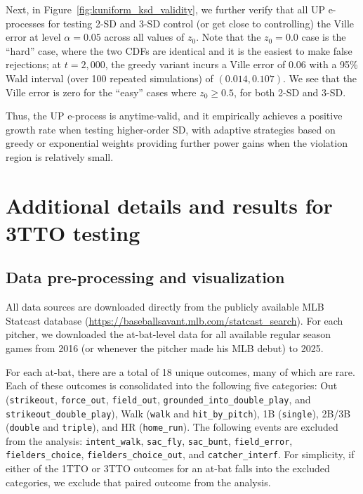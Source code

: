 \documentclass[12pt,twoside]{article}
\theoremstyle{plain}
\theoremstyle{definition}
\theoremstyle{remark}
\begin{document}
Next, in Figure~\ref{fig:kuniform_ksd_validity}, we further verify that all UP e-processes for testing 2-SD and 3-SD control (or get close to controlling) the Ville error at level $\alpha=0.05$ across all values of $z_0$. 
Note that the $z_0=0.0$ case is the ``hard'' case, where the two CDFs are identical and it is the easiest to make false rejections; at $t=2,000$, the greedy variant incurs a Ville error of $0.06$ with a 95\% Wald interval (over 100 repeated simulations) of $(0.014, 0.107)$. We see that the Ville error is zero for the ``easy'' cases where $z_0 \geq 0.5$, for both 2-SD and 3-SD.

Thus, the UP e-process is anytime-valid, and it empirically achieves a positive growth rate when testing higher-order SD, with adaptive strategies based on greedy or exponential weights providing further power gains when the violation region is relatively small. 


\section{Additional details and results for 3TTO testing}\label{app:real_data_exp}

\subsection{Data pre-processing and visualization}\label{app:baseball_data}

All data sources are downloaded directly from the publicly available MLB Statcast database (\url{https://baseballsavant.mlb.com/statcast_search}). 
For each pitcher, we downloaded the at-bat-level data for all available regular season games from 2016 (or whenever the pitcher made his MLB debut) to 2025. 

For each at-bat, there are a total of 18 unique outcomes, many of which are rare. 
Each of these outcomes is consolidated into the following five categories: 
Out (\texttt{strikeout}, \texttt{force\_out}, \texttt{field\_out}, \texttt{grounded\_into\_double\_play}, and \texttt{strikeout\_double\_play}), 
Walk (\texttt{walk} and \texttt{hit\_by\_pitch}), 
1B (\texttt{single}), 
2B/3B (\texttt{double} and \texttt{triple}), and
HR (\texttt{home\_run}). 
The following events are excluded from the analysis: \texttt{intent\_walk}, \texttt{sac\_fly}, \texttt{sac\_bunt}, \texttt{field\_error}, \texttt{fielders\_choice}, \texttt{fielders\_choice\_out}, and \texttt{catcher\_interf}. 
For simplicity, if either of the 1TTO or 3TTO outcomes for an at-bat falls into the excluded categories, we exclude that paired outcome from the analysis. 
\end{document}

